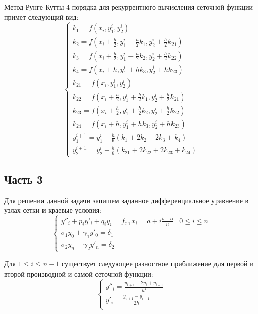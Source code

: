 \documentclass[a4paper,12pt,titlepage,finall]{article}
\begin{document}
Метод Рунге-Кутты 4 порядка для рекуррентного вычисления сеточной функции примет следующий вид:
\begin{equation*}
\begin{cases}
k_{1} = f(x_{i}, y^{i}_{1}, y^{i}_{2})\\
k_{2} = f(x_{i} + \frac{h}{2}, y^{i}_{1} + \frac{h}{2}k_{1}, y^{i}_{2} + \frac{h}{2}k_{21})\\
k_{3} = f(x_{i} + \frac{h}{2}, y^{i}_{1} + \frac{h}{2}k_{2}, y^{i}_{2} + \frac{h}{2}k_{22})\\
k_{4} = f(x_{i} + h, y^{i}_{1} + hk_{3}, y^{i}_{2} + hk_{23})\\
k_{21} = f(x_{i}, y^{i}_{1}, y^{i}_{2})\\
k_{22} = f(x_{i} + \frac{h}{2}, y^{i}_{1} + \frac{h}{2}k_{1}, y^{i}_{2} + \frac{h}{2}k_{21})\\
k_{23} = f(x_{i} + \frac{h}{2}, y^{i}_{1} + \frac{h}{2}k_{2}, y^{i}_{2} + \frac{h}{2}k_{22})\\
k_{24} = f(x_{i} + h, y^{i}_{1} + hk_{3}, y^{i}_{2} + hk_{23})\\
y^{i + 1}_{1} = y^{i}_{1} + \frac{h}{6}(k_{1} + 2k_{2} + 2k_{3} + k_{4})\\
y^{i + 1}_{2} = y^{i}_{2} + \frac{h}{6}(k_{21} + 2k_{22} + 2k_{23} + k_{24})
\end{cases}
\end{equation*}

\subsection{Часть 3}
Для решения данной задачи запишем заданное дифференциальное уравнение в узлах сетки и краевые условия:\\
\begin{equation*}
\begin{cases}
y''_{i}+p_{i}y'_{i}+q_{i}y_{i}=f_{x}, x_{i} = a + i\frac{b-a}{n} & 0 \leq i \leq n\\
\sigma_{1}y_{0} + \gamma_{1}y'_{0} = \delta_{1}\\
\sigma_{2}y_{n} + \gamma_{2}y'_{n} = \delta_{2}
\end{cases}
\end{equation*}

Для $ 1 \leq i \leq n-1 $ существует следующее разностное приближение для первой и второй производной и самой сеточной функции:\\
\begin{equation*}
\begin{cases}
y''_{i}=\frac{y_{i+1}-2y_{i}+y_{i-1}}{h^{2}}\\
y'_{i}=\frac{y_{i+1}-y_{i-1}}{2h}\\
\end{cases}
\end{equation*}
\end{document}
